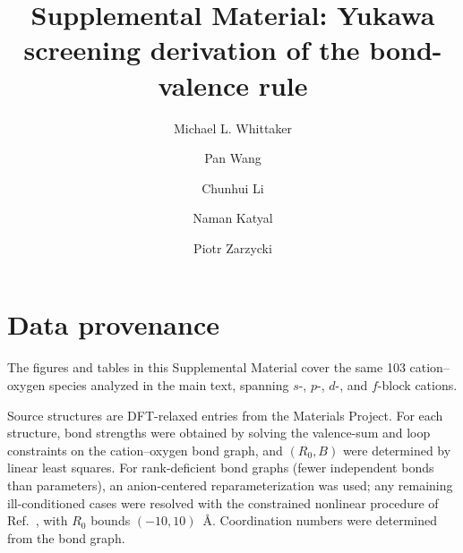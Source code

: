 \documentclass[aps,prl,twocolumn,10pt,superscriptaddress,floatfix]{revtex4-2}
\begin{document}
\title{Supplemental Material: Yukawa screening derivation of the bond-valence rule}

\author{Michael L. Whittaker}
\author{Pan Wang}
\author{Chunhui Li}
\author{Naman Katyal}
\author{Piotr Zarzycki}

\maketitle

\onecolumngrid

\section{Data provenance}

The figures and tables in this Supplemental Material cover the same
103 cation--oxygen species analyzed in the main text, spanning $s$-,
$p$-, $d$-, and $f$-block cations.

Source structures are DFT-relaxed entries from the Materials Project.
For each structure, bond strengths were obtained by solving the
valence-sum and loop constraints on the cation--oxygen bond graph,
and $(R_0,B)$ were determined by linear least squares.  For
rank-deficient bond graphs (fewer independent bonds than parameters),
an anion-centered reparameterization was used; any remaining
ill-conditioned cases were resolved with the constrained nonlinear
procedure of Ref.~, with $R_0$ bounds $(-10,10)$~\AA.
Coordination numbers were determined from the bond graph.
\end{document}
